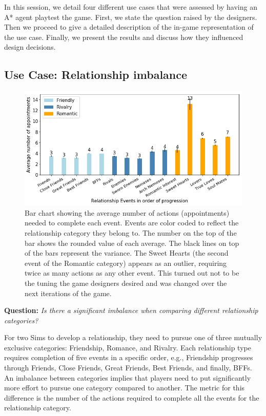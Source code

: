 \documentclass[letterpaper]{article} %
\begin{document}
In this session, we detail four different use cases that were assessed by having an A* agent playtest the game. First, we state the question raised by the designers. Then we proceed to give a detailed description of the in-game representation of the use case. Finally, we present the results and discuss how they influenced design decisions.

\subsection{Use Case: Relationship imbalance}

\begin{figure}[th]
\centering
\includegraphics[width=1.0\linewidth]{images/relationship_viz.png}
\caption{Bar chart showing the average number of actions (appointments) needed to complete each event. Events are color coded to reflect the relationship category they belong to. The number on the top of the bar shows the rounded value of each average. The black lines on top of the bars represent the variance. The Sweet Hearts (the second event of the Romantic category) appears as an outlier, requiring twice as many actions as any other event. This turned out not to be the tuning the game designers desired and was changed over the next iterations of the game.}
\label{Figure:bar_char_relationships}
\end{figure}

\textbf{Question:} {\em Is there a significant imbalance when comparing different relationship categories?}

For two Sims to develop a relationship, they need to pursue one of three mutually exclusive categories: Friendship, Romance, and Rivalry. Each relationship type requires completion of five events in a specific order, e.g., Friendship progresses through Friends, Close Friends, Great Friends, Best Friends, and finally, BFFs. An imbalance between categories implies that players need to put significantly more effort to pursue one category compared to another. The metric for this difference is the number of the actions required to complete all the events for the relationship category.
\end{document}
